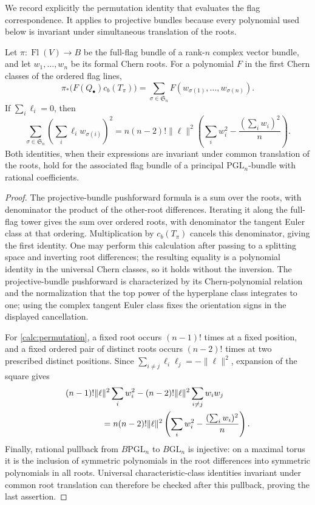We record explicitly the permutation identity that evaluates the flag
correspondence.  It applies to projective bundles because every polynomial
used below is invariant under simultaneous translation of the roots.

\begin{lemma}\label{calc:flag-sum}
Let $\pi:\operatorname{Fl}(V)\to B$ be the full-flag bundle of a rank-$n$
complex vector bundle, and let $w_1,\ldots,w_n$ be its formal Chern roots.
For a polynomial $F$ in the first Chern classes of the ordered flag lines,
\[
 \pi_*\bigl(F(Q_\bullet)c_b(T_\pi)\bigr)
   =\sum_{\sigma\in\mathfrak S_n}
      F(w_{\sigma(1)},\ldots,w_{\sigma(n)}).
\]
If $\sum_i\ell_i=0$, then
\begin{equation}\label{calc:permutation}
 \sum_{\sigma\in\mathfrak S_n}
       \left(\sum_i\ell_iw_{\sigma(i)}\right)^2
 =n(n-2)!\|\ell\|^2
    \left(\sum_iw_i^2-\frac{(\sum_iw_i)^2}{n}\right).
\end{equation}
Both identities, when their expressions are invariant under common
translation of the roots, hold for the associated flag bundle of a
principal $\mathrm{PGL}_n$-bundle with rational coefficients.
\end{lemma}

\begin{proof}
The projective-bundle pushforward formula is a sum over the roots, with
denominator the product of the other-root differences.  Iterating it along
the full-flag tower gives the sum over ordered roots, with denominator the
tangent Euler class at that ordering.  Multiplication by $c_b(T_\pi)$
cancels this denominator, giving the first identity.  One may perform this
calculation after passing to a splitting space and inverting root
differences; the resulting equality is a polynomial identity in the
universal Chern classes, so it holds without the inversion.  The
projective-bundle pushforward is characterized by its Chern-polynomial
relation and the normalization that the top power of the hyperplane class
integrates to one; using the complex tangent Euler class fixes the
orientation signs in the displayed cancellation.

For \eqref{calc:permutation}, a fixed root occurs $(n-1)!$ times at a fixed
position, and a fixed ordered pair of distinct roots occurs $(n-2)!$ times
at two prescribed distinct positions.  Since
$\sum_{i\ne j}\ell_i\ell_j=-\|\ell\|^2$, expansion of the square gives
\[
 \begin{split}
 &(n-1)!\|\ell\|^2\sum_iw_i^2
 -(n-2)!\|\ell\|^2\sum_{i\ne j}w_iw_j\\
 &\hspace{15mm}
 =n(n-2)!\|\ell\|^2
    \left(\sum_iw_i^2-\frac{(\sum_iw_i)^2}{n}\right).
 \end{split}
\]
Finally, rational pullback from $B\mathrm{PGL}_n$ to $B\mathrm{GL}_n$ is
injective: on a maximal torus it is the inclusion of symmetric polynomials
in the root differences into symmetric polynomials in all roots.
Universal characteristic-class identities invariant under common root
translation can therefore be checked after this pullback, proving the
last assertion.
\end{proof}

